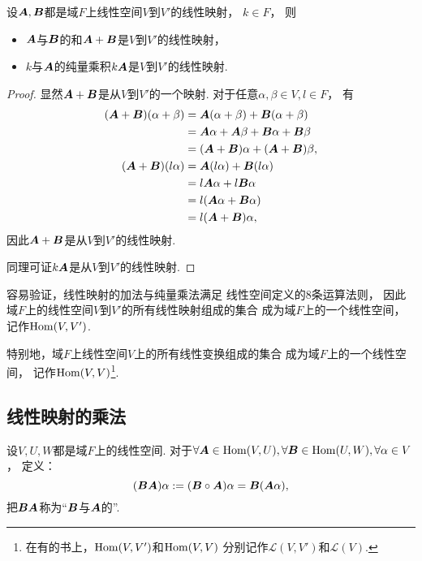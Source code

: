 \begin{proposition}
设\(\boldsymbol{A},\boldsymbol{B}\)都是域\(F\)上线性空间\(V\)到\(V'\)的线性映射，
\(k\in F\)，
则\begin{itemize}
	\item \(\boldsymbol{A}\)与\(\boldsymbol{B}\)的和\(\boldsymbol{A}+\boldsymbol{B}\)是\(V\)到\(V'\)的线性映射，
	\item \(k\)与\(\boldsymbol{A}\)的纯量乘积\(k\boldsymbol{A}\)是\(V\)到\(V'\)的线性映射.
\end{itemize}
\begin{proof}
显然\(\boldsymbol{A}+\boldsymbol{B}\)是从\(V\)到\(V'\)的一个映射.
对于任意\(\alpha,\beta \in V,
l \in F\)，
有\begin{align*}
	(\boldsymbol{A}+\boldsymbol{B})(\alpha+\beta)
	&= \boldsymbol{A}(\alpha+\beta) + \boldsymbol{B}(\alpha+\beta) \\
	&= \boldsymbol{A}\alpha + \boldsymbol{A}\beta + \boldsymbol{B}\alpha + \boldsymbol{B}\beta \\
	&= (\boldsymbol{A}+\boldsymbol{B})\alpha + (\boldsymbol{A}+\boldsymbol{B})\beta, \\
	(\boldsymbol{A}+\boldsymbol{B})(l\alpha)
	&= \boldsymbol{A}(l\alpha) + \boldsymbol{B}(l\alpha) \\
	&= l\boldsymbol{A}\alpha + l\boldsymbol{B}\alpha \\
	&= l(\boldsymbol{A}\alpha + \boldsymbol{B}\alpha) \\
	&= l(\boldsymbol{A}+\boldsymbol{B}) \alpha,
\end{align*}
因此\(\boldsymbol{A}+\boldsymbol{B}\)是从\(V\)到\(V'\)的线性映射.

同理可证\(k\boldsymbol{A}\)是从\(V\)到\(V'\)的线性映射.
\end{proof}
\end{proposition}

容易验证，线性映射的加法与纯量乘法满足
线性空间定义的8条运算法则，
因此域\(F\)上的线性空间\(V\)到\(V'\)的所有线性映射组成的集合
成为域\(F\)上的一个线性空间，
记作\(\operatorname{Hom}(V,V')\).

特别地，域\(F\)上线性空间\(V\)上的所有线性变换组成的集合
成为域\(F\)上的一个线性空间，
记作\(\operatorname{Hom}(V,V)\)\footnote{
	在有的书上，\(\operatorname{Hom}(V,V')\)和\(\operatorname{Hom}(V,V)\)
	分别记作\(\mathcal{L}(V,V')\)和\(\mathcal{L}(V)\).
}.

\subsection{线性映射的乘法}
\begin{definition}
设\(V,U,W\)都是域\(F\)上的线性空间.
对于\(\forall\boldsymbol{A}\in\operatorname{Hom}(V,U),
\forall\boldsymbol{B}\in\operatorname{Hom}(U,W),
\forall\alpha \in V\)，
定义：\begin{equation*}
	(\boldsymbol{B}\boldsymbol{A})\alpha
	:= (\boldsymbol{B} \circ \boldsymbol{A})\alpha
	= \boldsymbol{B}(\boldsymbol{A}\alpha),
\end{equation*}
把\(\boldsymbol{B}\boldsymbol{A}\)称为“\(\boldsymbol{B}\)与\(\boldsymbol{A}\)的”.
\end{definition}

